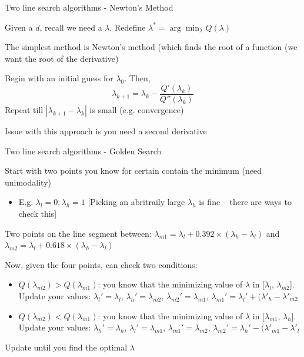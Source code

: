 \documentclass[notes,11pt, aspectratio=169]{beamer}
\newenvironment{wideitemize}{\itemize\addtolength{\itemsep}{10pt}}{\enditemize}
\begin{document}
  \begin{frame}{Two line search algorithms - Newton's Method}
    \begin{wideitemize}
    \item Given a $d$, recall we need a $\lambda$. Redefine $\lambda^{*} = \arg\min_{\lambda} Q(\lambda)$
    \item The simplest method is Newton's method (which finds the root
      of a function (we want the root of the derivative)
    \item Begin with an initial guess for $\lambda_{0}$. Then,
      $$\lambda_{k+1} = \lambda_{k} - \frac{Q'(\lambda_{k})}{Q''(\lambda_{k})}$$
      Repeat till $|\lambda_{k+1}-\lambda_{k}|$ is small
      (e.g. convergence)
    \item Issue with this approach is you need a second derivative
    \end{wideitemize}
  \end{frame}

  \begin{frame}{Two line search algorithms - Golden Search}
    \begin{wideitemize}
    \item Start with two points you know for certain contain the minimum (need unimodality)
      \begin{itemize}
      \item E.g. $\lambda_{l} = 0, \lambda_{h} =
        1$ [Picking an abritraily large $\lambda_{h}$ is fine -- there
        are ways to check this]
      \end{itemize}
    \item Two points on the line segment between: $\lambda_{m1} = \lambda_{l} + 0.392 \times (\lambda_{h} - \lambda_{l})$ and $\lambda_{m2} = \lambda_{l} + 0.618 \times (\lambda_{h} - \lambda_{l})$
    \item Now, given the four points, can check two conditions:
      \begin{itemize}
      \item $Q(\lambda_{m2}) > Q(\lambda_{m1})$: you know that the minimizing value of  $\lambda $ in [$\lambda_{l}$, $\lambda_{m2}$]. Update your values:  $\lambda_{l}' = \lambda_{l}$, $\lambda_{h}' = \lambda_{m2}$, $\lambda_{m2}' = \lambda_{m1}$, $\lambda_{m1}' =  \lambda_{l}' + (\lambda'_{h} - \lambda'_{m2}$
      \item $Q(\lambda_{m2}) < Q(\lambda_{m1})$: you know that the minimizing value of  $\lambda $ in [$\lambda_{m1}$, $\lambda_{h}$]. Update your values:  $\lambda_{h}' = \lambda_{h}$, $\lambda_{l}' = \lambda_{m1}$, $\lambda_{m1}' = \lambda_{m2}$, $\lambda_{m2}' =  \lambda_{h}' - (\lambda'_{m1} - \lambda'_{l}$
      \end{itemize}
    \item Update until you find the optimal $\lambda$
    \end{wideitemize}
  \end{frame}
\end{document}
